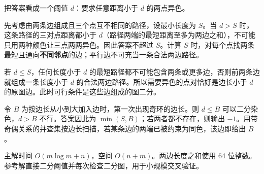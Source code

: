 \Legend
把答案看成一个阈值 $d$：要求任意距离小于 $d$ 的两点异色。

先考虑由两条边组成且三个点互不相同的路径，设最小长度为 $S$。当 $d>S$ 时，这条路径的三对点距离都小于 $d$（路径两端的最短距离至多为两边之和），不可能只用两种颜色让三点两两异色。因此答案不超过 $S$。计算 $S$ 时，对每个点找两条最短且通向\textbf{不同邻点}的边；平行边不可充当一条合法两边路径。

若 $d\le S$，任何长度小于 $d$ 的最短路径都不可能包含两条或更多边，否则前两条边就组成一条长度小于 $d$ 的合法两边路径。所以需要异色的点对恰好是边长小于 $d$ 的原图边。此时可行条件是这些边组成的图二分。

令 $B$ 为按边长从小到大加入边时，第一次出现奇环的边长。则 $d\le B$ 可以二分染色，$d>B$ 不行。答案因此为 $\min(S,B)$；若两者都不存在，则输出 $-1$。用带奇偶关系的并查集按边长扫描，若某条边的两端已被约束为同色，该边即给出 $B$。

主解时间 $O(m\log m+n)$，空间 $O(n+m)$。两边长度之和使用 64 位整数。参考解直接二分阈值并每次检查二分图，用于小规模交叉验证。
